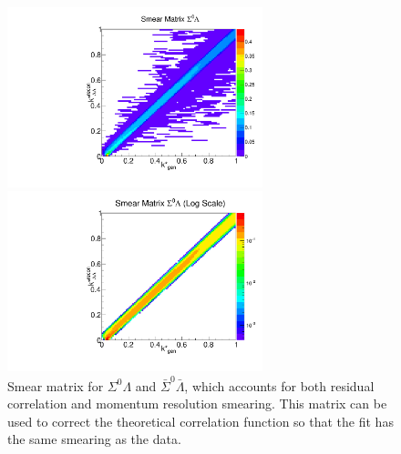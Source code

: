 \begin{figure}[ht]
\begin{minipage}{17.5pc}
\includegraphics[width=17.5pc]{Figures/SmearMatrices/2016-7-19-SmearMatrixSigmaLambdaNormLLAA.pdf}
\end{minipage}\hspace{0.5pc}
\begin{minipage}{17.5pc}
\includegraphics[width=17.5pc]{Figures/SmearMatrices/2016-7-19-SmearMatrixSigmaLambdaNormLLAALog.pdf}
\end{minipage} 
\caption[Smear matrix -- $\Sigma^0\Lambda$ and $\bar{\Sigma}^0\bar{\Lambda}$]{ 
Smear matrix for $\Sigma^0\Lambda$ and $\bar{\Sigma}^0\bar{\Lambda}$, which accounts for both residual correlation and momentum resolution smearing. This matrix can be used to correct the theoretical correlation function so that the fit has the same smearing as the data.
}
\end{figure}

